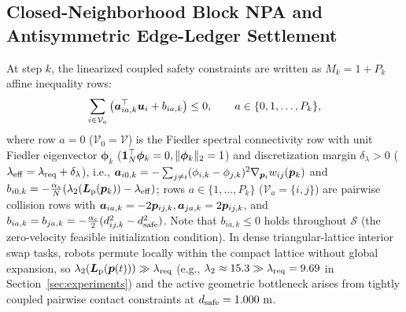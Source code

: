 \subsection{Closed-Neighborhood Block NPA and Antisymmetric Edge-Ledger Settlement}\label{subsec:npa-prelim}
At step $k$, the linearized coupled safety constraints are written as $M_k=1+P_k$ affine inequality rows:
\begin{equation}
 \sum_{i\in\mathcal V_a}\big(\boldsymbol a_{ia,k}^{\top}\boldsymbol{u}_i+b_{ia,k}\big)\le 0,\qquad a\in\{0,1,\dots,P_k\},
 \label{eq:coupled-rows}
\end{equation}
where row $a=0$ ($\mathcal V_0=\mathcal V$) is the Fiedler spectral connectivity row with unit Fiedler eigenvector $\boldsymbol\phi_k$ ($\boldsymbol 1_N^{\top}\boldsymbol\phi_k=0,\lVert\boldsymbol\phi_k\rVert_2=1$) and discretization margin $\delta_\lambda>0$ ($\lambda_{\mathrm{eff}}=\lambda_{\mathrm{req}}+\delta_\lambda$), i.e., $\boldsymbol a_{i0,k}=-\sum_{j\ne i}(\phi_{i,k}-\phi_{j,k})^2\nabla_{\boldsymbol{p}_i}w_{ij}(\boldsymbol{p}_k)$ and $b_{i0,k}=-\frac{\alpha_s}{N}(\lambda_2(\boldsymbol{L}_{\mathrm{p}}(\boldsymbol{p}_k))-\lambda_{\mathrm{eff}})$; rows $a\in\{1,\dots,P_k\}$ ($\mathcal V_a=\{i,j\}$) are pairwise collision rows with $\boldsymbol a_{ia,k}=-2\boldsymbol{p}_{ij,k},\boldsymbol a_{ja,k}=2\boldsymbol{p}_{ij,k}$, and $b_{ia,k}=b_{ja,k}=-\frac{\alpha_c}{2}(d_{ij,k}^2-d_{\mathrm{safe}}^2)$. Note that $b_{ia,k}\le 0$ holds throughout $\mathcal S$ (the zero-velocity feasible initialization condition). In dense triangular-lattice interior swap tasks, robots permute locally within the compact lattice without global expansion, so $\lambda_2(\boldsymbol{L}_{\mathrm{p}}(\boldsymbol{p}(t)))\gg\lambda_{\mathrm{req}}$ (e.g., $\lambda_2\approx 15.3\gg\lambda_{\mathrm{req}}=9.69$ in Section~\ref{sec:experiments}) and the active geometric bottleneck arises from tightly coupled pairwise contact constraints at $d_{\mathrm{safe}}=1.000\ \mathrm m$.

